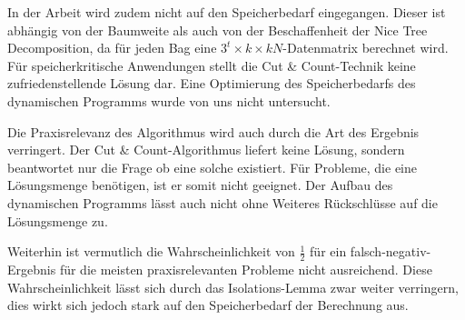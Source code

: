 In der Arbeit \cite{cygan_solving_2011} wird zudem nicht auf den Speicherbedarf eingegangen. 
Dieser ist abhängig von der Baumweite als auch von der Beschaffenheit der Nice Tree Decomposition, da für jeden Bag eine $3^t\times k\times kN$-Datenmatrix berechnet wird. Für speicherkritische Anwendungen stellt die Cut \& Count-Technik keine zufriedenstellende Lösung dar. Eine Optimierung des Speicherbedarfs des dynamischen Programms wurde von uns nicht untersucht.

Die Praxisrelevanz des Algorithmus wird auch durch die Art des Ergebnis verringert. Der Cut \& Count-Algorithmus liefert keine Lösung, sondern beantwortet nur die Frage ob eine solche existiert. Für Probleme, die eine Lösungsmenge benötigen, ist er somit nicht geeignet. Der Aufbau des dynamischen Programms lässt auch nicht ohne Weiteres Rückschlüsse auf die Lösungsmenge zu.

Weiterhin ist vermutlich die Wahrscheinlichkeit von $\frac{1}{2}$ für ein falsch-negativ-Ergebnis für die meisten praxisrelevanten Probleme nicht ausreichend. Diese Wahrscheinlichkeit lässt sich durch das Isolations-Lemma zwar weiter verringern, dies wirkt sich jedoch stark auf den Speicherbedarf der Berechnung aus.
